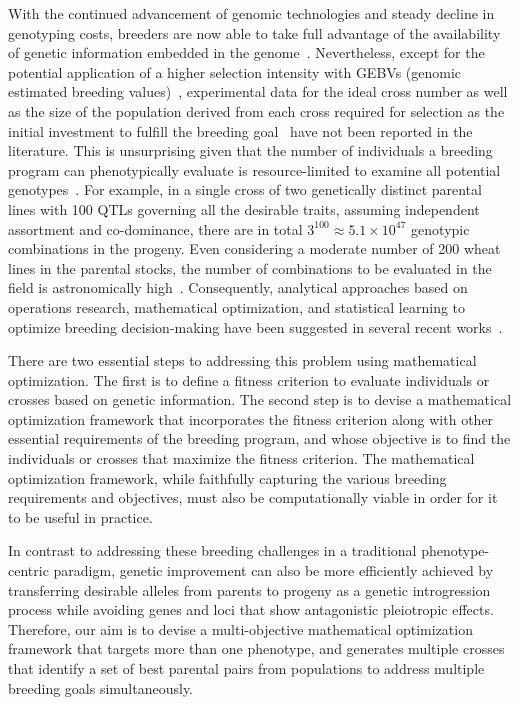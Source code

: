\documentclass[12pt, a4paper, bibliography=totoc]{scrartcl}
\begin{document}
With the continued advancement of genomic technologies and steady decline in genotyping costs, breeders are now able to take full advantage of the availability of genetic information embedded in the genome~\citep{heffner2010plant, hayes2009invited}. Nevertheless, except for the potential application of a higher selection intensity with GEBVs (genomic estimated breeding values)~\citep{ meuwissen2001prediction}, experimental data for the ideal cross number as well as the size of the population derived from each cross required for selection as the initial investment to fulfill the breeding goal~\citep{donald1968breeding} have not been reported in the literature. This is unsurprising given that the number of individuals a breeding program can phenotypically evaluate is  resource-limited  to examine all potential genotypes~\citep{rincent2017predicting}. For example, in a single cross of two genetically distinct parental lines with 100 QTLs governing all the desirable traits, assuming independent assortment and co-dominance, there are in total $3^{100} \approx 5.1 \times 10^{47}$ genotypic combinations in the progeny. Even considering  a moderate number of 200 wheat lines in the parental stocks, the number of combinations to be evaluated in the field is astronomically high~\citep{beans2020inner}. Consequently, analytical approaches based on operations research, mathematical optimization, and statistical learning to optimize  breeding decision-making have been suggested  in several recent works~\citep{han2017predicted,kusmec2021interdisciplinary}. 

There are two essential steps to addressing this problem using mathematical optimization. The first is to define a fitness criterion to evaluate individuals or crosses based on genetic information. The second step is to devise a mathematical optimization framework that incorporates the fitness criterion along with other essential requirements of the breeding program, and whose objective is to find the individuals or crosses that maximize the fitness criterion.  The mathematical optimization framework, while faithfully capturing the various breeding requirements and objectives, must also be computationally viable in order for it to be useful in practice.



In contrast to addressing these breeding challenges in a traditional phenotype-centric paradigm, genetic improvement can also be more efficiently achieved by transferring desirable alleles from parents to progeny as a genetic introgression process while avoiding genes and loci that show antagonistic pleiotropic effects. Therefore, our aim is to devise a multi-objective mathematical optimization  framework that targets more than one phenotype, and generates multiple crosses that identify a set of best parental pairs from populations to address multiple breeding goals simultaneously.
\end{document}
